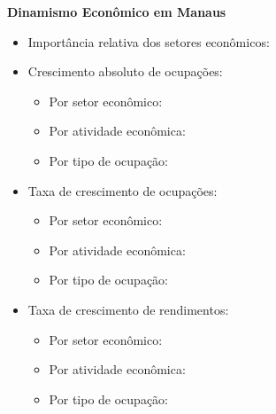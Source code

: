 \documentclass[10pt]{beamer}
\begin{document}
\begin{frame}[label=indice_principal_amz_manaus]{}

\textit{\hyperlink{indice_principal}{}}

\textbf{Dinamismo Econômico em Manaus}
\vspace{2mm}

\begin{itemize}

\item{Importância relativa dos setores econômicos: \hyperlink{_amz_manaus_importancia_relativa}{}}
\vspace{1mm}

\item{Crescimento  absoluto de ocupações:
	\begin{itemize}
	\item{Por setor econômico: \hyperlink{amzmanausrkngnocuporsetor}{}}
	\item{Por atividade econômica: \hyperlink{amzmanausrkngnocuporatividade}{}}
	\item{Por tipo de ocupação: \hyperlink{amzmanausrkngnocuporocupacao}{}}
	\end{itemize}
}
\vspace{1mm}

\item{Taxa de crescimento de ocupações:
	\begin{itemize}
	\item{Por setor econômico: \hyperlink{amzmanausrkngtxocuporsetor}{}}
	\item{Por atividade econômica: \hyperlink{amzmanausrkngtxocuporatividade}{}}
	\item{Por tipo de ocupação: \hyperlink{amzmanausrkngtxocuporocupacao}{}}
	\end{itemize}
}
\vspace{1mm}

\item{Taxa de crescimento de rendimentos:
	\begin{itemize}
	\item{Por setor econômico: \hyperlink{amzmanausrkngtxrendaporsetor}{}}
	\item{Por atividade econômica: \hyperlink{amzmanausrkngtxrendaporatividade}{}}
	\item{Por tipo de ocupação: \hyperlink{amzmanausrkngtxrendaporocupacao}{}}
	\end{itemize}
}
\vspace{1mm}

\end{itemize}

\end{frame}
\end{document}
